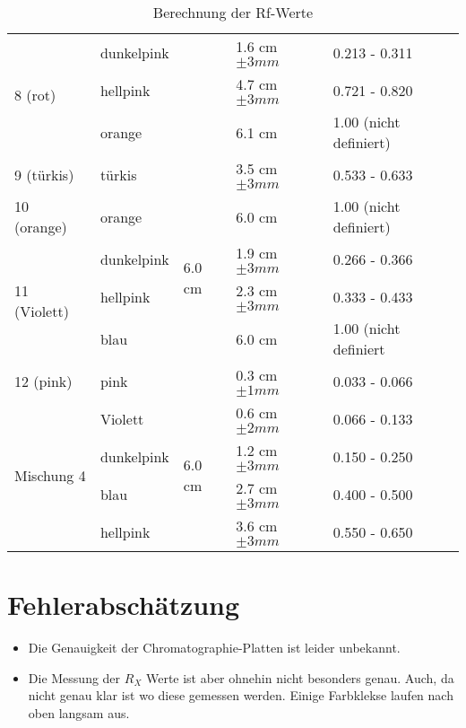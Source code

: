 \documentclass[11pt,paper=a4,final]{scrartcl}
\begin{document}
\begin{savenotes}
\begin{table}[ht]
\begin{tabular}{|l|l|l|l|l|}
      \multirow{3}{*}{8 (rot)}
      			& dunkelpink	& 				& 1.6 cm \(\pm 3 mm \)	& 0.213 - 0.311		\\ 
      			& hellpink	&				& 4.7 cm \(\pm 3 mm \)	& 0.721 - 0.820		\\
      			& orange	&				& 6.1 cm		& 1.00 (nicht definiert)\\ \hline
      9 (t\"urkis)	& t\"urkis	& \multirow{6}{*}{6.0 cm }	& 3.5 cm \(\pm 3 mm \)	& 0.533 - 0.633		\\ \cline{1-2} \cline{4-5}
       10 (orange)	& orange	& 				& 6.0 cm		& 1.00 (nicht definiert)\\ \cline{1-2} \cline{4-5}
      \multirow{3}{*}{11 (Violett)}
      			& dunkelpink	&				& 1.9 cm \(\pm 3 mm \)	& 0.266 - 0.366		\\
      			& hellpink	&				& 2.3 cm \(\pm 3 mm \)	& 0.333 - 0.433		\\
      			& blau		&				& 6.0 cm		& 1.00 (nicht definiert \\ \cline{1-2} \cline{4-5}
      12 (pink)		& pink		&				& 0.3 cm \(\pm 1 mm \)	& 0.033 - 0.066		\\ \hline
      \multirow{4}{*}{Mischung 4}
      			& Violett	& \multirow{4}{*}{6.0 cm }	& 0.6 cm \(\pm 2 mm \)	& 0.066 - 0.133		\\
      			& dunkelpink	&				& 1.2 cm \(\pm 3 mm \)	& 0.150 - 0.250		\\
			& blau		& 				& 2.7 cm \(\pm 3 mm \)	& 0.400 - 0.500		\\
      			& hellpink	& 				& 3.6 cm \(\pm 3 mm \)	& 0.550 - 0.650		\\ \hline
      	
    \end{tabular}
    \caption{Berechnung der Rf-Werte}
    \end{table}
\end{savenotes}

\section{Fehlerabsch\"atzung}
\begin{itemize}
  \item Die Genauigkeit der Chromatographie-Platten ist leider unbekannt.
  \item Die Messung der \( R_X \) Werte ist aber ohnehin nicht besonders genau. Auch, da nicht genau klar ist wo diese gemessen werden. Einige Farbklekse laufen nach oben langsam aus.
\end{itemize}
\end{document}
